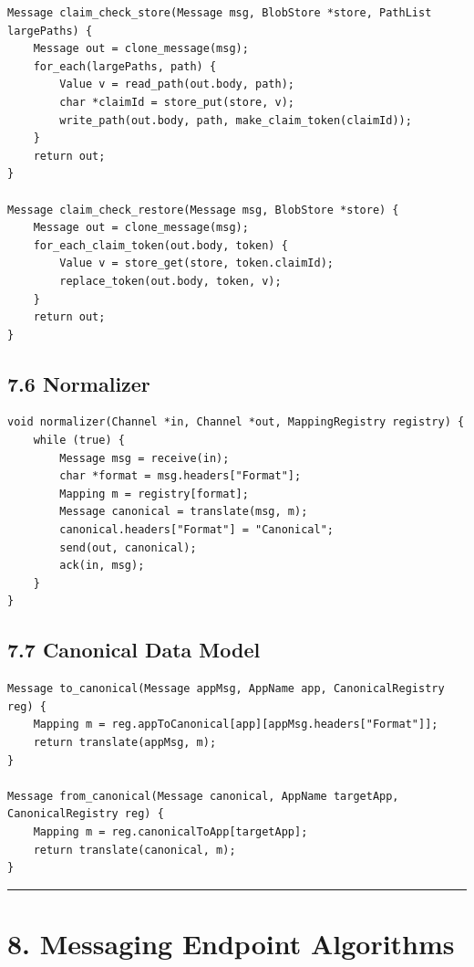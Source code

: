 \documentclass[11pt]{article}
\begin{document}
\begin{verbatim}
Message claim_check_store(Message msg, BlobStore *store, PathList largePaths) {
    Message out = clone_message(msg);
    for_each(largePaths, path) {
        Value v = read_path(out.body, path);
        char *claimId = store_put(store, v);
        write_path(out.body, path, make_claim_token(claimId));
    }
    return out;
}

Message claim_check_restore(Message msg, BlobStore *store) {
    Message out = clone_message(msg);
    for_each_claim_token(out.body, token) {
        Value v = store_get(store, token.claimId);
        replace_token(out.body, token, v);
    }
    return out;
}
\end{verbatim}

\subsection{7.6 Normalizer}\label{normalizer}

\begin{verbatim}
void normalizer(Channel *in, Channel *out, MappingRegistry registry) {
    while (true) {
        Message msg = receive(in);
        char *format = msg.headers["Format"];
        Mapping m = registry[format];
        Message canonical = translate(msg, m);
        canonical.headers["Format"] = "Canonical";
        send(out, canonical);
        ack(in, msg);
    }
}
\end{verbatim}

\subsection{7.7 Canonical Data Model}\label{canonical-data-model}

\begin{verbatim}
Message to_canonical(Message appMsg, AppName app, CanonicalRegistry reg) {
    Mapping m = reg.appToCanonical[app][appMsg.headers["Format"]];
    return translate(appMsg, m);
}

Message from_canonical(Message canonical, AppName targetApp, CanonicalRegistry reg) {
    Mapping m = reg.canonicalToApp[targetApp];
    return translate(canonical, m);
}
\end{verbatim}

\begin{center}\rule{0.5\linewidth}{0.5pt}\end{center}

\section{8. Messaging Endpoint
Algorithms}\label{messaging-endpoint-algorithms}
\end{document}
